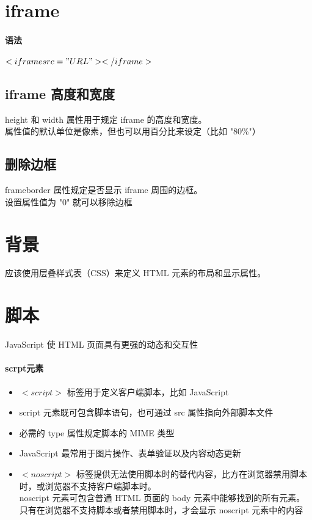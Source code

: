 \documentclass[10pt,UTF8]{ctexart}
\begin{document}
\section{iframe}
\paragraph{语法}$<iframe src="URL"> </iframe>$
\subsection{iframe 高度和宽度}
height 和 width 属性用于规定 iframe 的高度和宽度。\\
属性值的默认单位是像素，但也可以用百分比来设定（比如 "80\%"）
\subsection{删除边框}frameborder 属性规定是否显示 iframe 周围的边框。\\
设置属性值为 "0" 就可以移除边框

\section{背景}

应该使用层叠样式表（CSS）来定义 HTML 元素的布局和显示属性。

\section{脚本}
JavaScript 使 HTML 页面具有更强的动态和交互性
\paragraph{scrpt元素}
\begin{itemize}
\item $<script>$ 标签用于定义客户端脚本，比如 JavaScript
\item script 元素既可包含脚本语句，也可通过 src 属性指向外部脚本文件
\item 必需的 type 属性规定脚本的 MIME 类型
\item JavaScript 最常用于图片操作、表单验证以及内容动态更新
\item $<noscript>$ 标签提供无法使用脚本时的替代内容，比方在浏览器禁用脚本时，或浏览器不支持客户端脚本时。\\
noscript 元素可包含普通 HTML 页面的 body 元素中能够找到的所有元素。\\
只有在浏览器不支持脚本或者禁用脚本时，才会显示 noscript 元素中的内容
\end{itemize}
\end{document}

